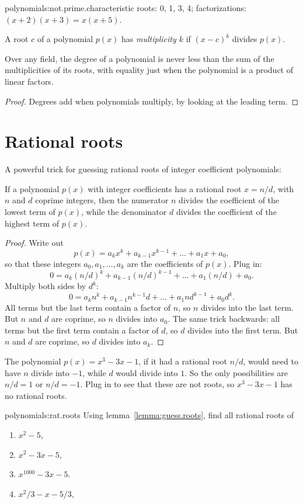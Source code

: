 \begin{answer}{polynomials:not.prime.characteristic}
roots: 0, 1, 3, 4; factorizations: \((x+2)(x+3)=x(x+5)\).
\end{answer}
A root \(c\) of a polynomial \(p(x)\) has \emph{multiplicity \(k\)} if \((x-c)^k\) divides \(p(x)\).
\begin{corollary}
Over any field, the degree of a polynomial is never less than the sum of the multiplicities of its roots, with equality just when the polynomial is a product of linear factors.
\end{corollary}
\begin{proof}
Degrees add when polynomials multiply, by looking at the leading term.
\end{proof}

\section{Rational roots}
A powerful trick for guessing rational roots of integer coefficient polynomials:
\begin{lemma}\label{lemma:guess.roots}
If a polynomial \(p(x)\) with integer coefficients has a rational root \(x=n/d\), with \(n\) and \(d\) coprime integers, then the numerator \(n\) divides the coefficient of the lowest term of \(p(x)\), while the denominator \(d\) divides the coefficient of the highest term of \(p(x)\).
\end{lemma}
\begin{proof}
Write out 
\[
p(x)=a_k x^k + a_{k-1} x^{k-1} + \dots + a_1 x + a_0,
\]
so that these integers \(a_0, a_1, \dots, a_k\) are the coefficients of \(p(x)\).
Plug in:
\[
0 = a_k (n/d)^k + a_{k-1} (n/d)^{k-1} + \dots + a_1 (n/d) + a_0.
\]
Multiply both sides by \(d^k\):
\[
0 = a_k n^k + a_{k-1} n^{k-1} d  + \dots + a_1 n d^{k-1} + a_0 d^k.
\]
All terms but the last term contain a factor of \(n\), so \(n\) divides into the last term.
But \(n\) and \(d\) are coprime, so \(n\) divides into \(a_0\).
The same trick backwards: all terms but the first term contain a factor of \(d\), so \(d\) divides into the first term.
But \(n\) and \(d\) are coprime, so \(d\) divides into \(a_k\).
\end{proof}
\begin{example}\label{example:x.cubed}
The polynomial \(p(x)=x^3-3x-1\), if it had a rational root \(n/d\), would need to have \(n\) divide into \(-1\), while \(d\) would divide into \(1\).
So the only possibilities are \(n/d=1\) or \(n/d=-1\).
Plug in to see that these are not roots, so \(x^3-3x-1\) has no rational roots.
\end{example}
\begin{problem}{polynomials:rat.roots}
Using lemma~\vref{lemma:guess.roots}, find all rational roots of 
\begin{enumerate}
\item
\(x^2-5\),
\item
\(x^2-3x-5\),
\item
\(x^{1000}-3x-5\).
\item
\(x^2/3-x-5/3\),
\end{enumerate}
\end{problem}




